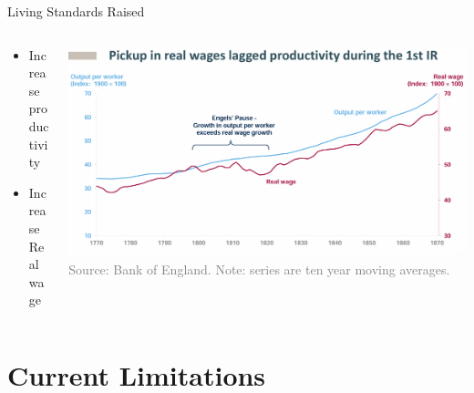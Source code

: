 \documentclass{beamer}
\begin{document}
    \begin{frame}{Living Standards Raised}{\thesection \, \secname}
       \begin{columns}
            \begin{column}{0.3\textwidth}
                \begin{itemize}
                    \item Increase productivity
                    \item Increase Real wage
                \end{itemize}
            \end{column}
            \begin{column}{0.7\textwidth}
                \includegraphics[width=\textwidth]{收入提高.png}\newline
                \renewcommand{\footnoterule}
            \footnotetext{\textcolor{gray}{\tiny Source: Bank of England.  Note:  series are ten year moving averages.}}
            \end{column}
        \end{columns}
    \end{frame}

    \section{Current Limitations}
\end{document}
